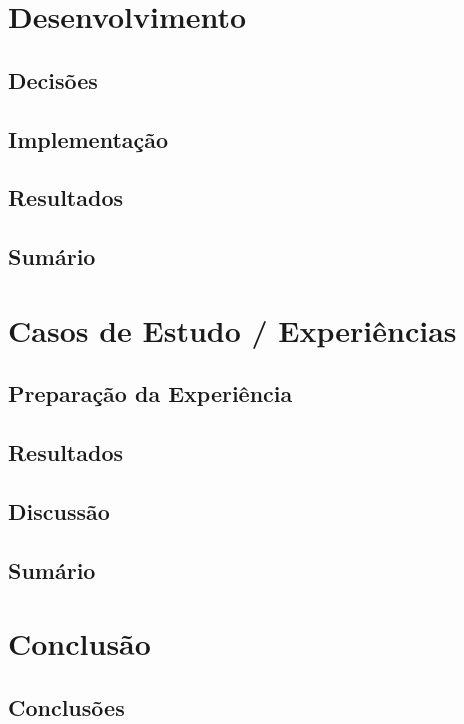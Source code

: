 \documentclass[a4paper]{report}
\begin{document}
	\chapter{Desenvolvimento}
		
	\section{Decisões}
    \section{Implementação}
    \section{Resultados}
	\section{Sumário}

	\chapter{Casos de Estudo / Experiências}
	\section{Preparação da Experiência}
    \section{Resultados}
    \section{Discussão}
	\section{Sumário}

	\chapter{Conclusão}
	\section{Conclusões}
\end{document}
